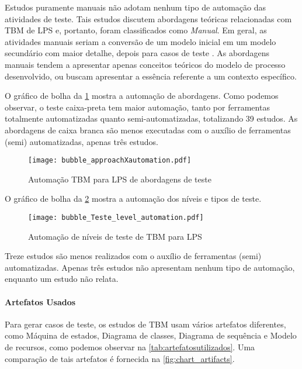 Estudos puramente manuais não adotam nenhum tipo de automação das atividades de teste. Tais estudos discutem abordagens teóricas relacionadas com TBM de LPS e, portanto, foram classificados como \textit{Manual}. Em geral, as atividades manuais seriam a conversão de um modelo inicial em um modelo secundário com maior detalhe, depois para casos de teste \cite{lity2016applying, lochau2012parameterized, beohar2014spinal}. As abordagens manuais tendem a apresentar apenas conceitos teóricos do modelo de processo desenvolvido, ou buscam apresentar a essência referente a um contexto específico.

O gráfico de bolha da \ref{fig:approachXautomation} mostra a automação de abordagens. Como podemos observar, o teste caixa-preta tem maior automação, tanto por ferramentas totalmente automatizadas quanto semi-automatizadas, totalizando 39 estudos. As abordagens de caixa branca são menos executadas com o auxílio de ferramentas (semi) automatizadas, apenas três estudos.


\begin{figure}[!ht]	
	\centering
	\texttt{[image: bubble\_approachXautomation.pdf]}
	\caption{Automação TBM para LPS de abordagens de teste}
	\label{fig:approachXautomation}
\end{figure}

O gráfico de bolha da \ref{fig:teste_levelxautomation} mostra a automação dos níveis e tipos de teste.

\begin{figure}[!ht]
	\centering	
	\texttt{[image: bubble\_Teste\_level\_automation.pdf]}
	\caption{Automação de níveis de teste de TBM para LPS}
	\label{fig:teste_levelxautomation}
\end{figure}

Treze estudos são menos realizados com o auxílio de ferramentas (semi) automatizadas. Apenas três estudos não apresentam nenhum tipo de automação, enquanto um estudo não relata.


\paragraph{\textbf{Artefatos Usados}}

Para gerar casos de teste, os estudos de TBM usam vários artefatos diferentes, como Máquina de estados, Diagrama de classes, Diagrama de sequência e Modelo de recursos, como podemos observar na \ref{tab:artefatosutilizados}. Uma comparação de tais artefatos é fornecida na \ref{fig:chart_artifacts}.

